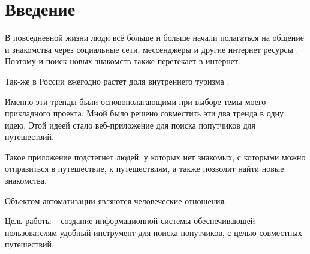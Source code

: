 \section*{Введение}

В повседневной жизни люди всё больше и больше начали полагаться на общение и знакомства через социальные сети, мессенджеры и другие интернет ресурсы \cite{social-media-users}. Поэтому и поиск новых знакомств также перетекает в интернет.

Так-же в России ежегодно растет доля внутреннего туризма \cite{vnut-turism}.

Именно эти тренды были основополагающими при выборе темы моего прикладного проекта. Мной было решено совместить эти два тренда в одну идею. Этой идеей стало веб-приложение для поиска попутчиков для путешествий.

Такое приложение подстегнет людей, у которых нет знакомых, с которыми можно отправиться в путешествие, к путешествиям, а также позволит найти новые знакомства.

Объектом автоматизации являются человеческие отношения.

Цель работы – создание информационной системы обеспечивающей пользователям удобный инструмент для поиска попутчиков, с целью совместных путешествий.

